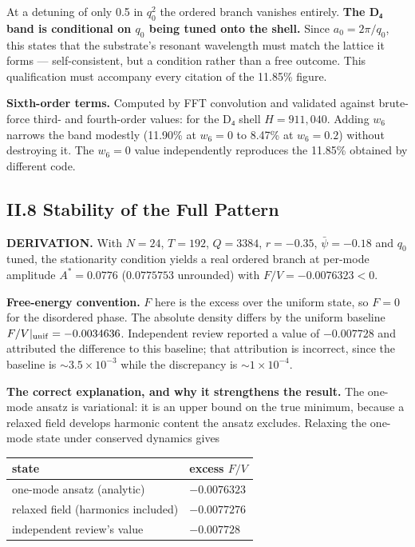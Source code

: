 \documentclass[a4paper,11pt]{article}
\begin{document}
At a detuning of only 0.5 in $q_0^2$ the ordered branch vanishes entirely. \textbf{The D₄ band is conditional on $q_0$ being tuned onto the shell.} Since $a_0=2\pi/q_0$, this states that the substrate's resonant wavelength must match the lattice it forms — self-consistent, but a condition rather than a free outcome. This qualification must accompany every citation of the 11.85\% figure.

\textbf{Sixth-order terms.} Computed by FFT convolution and validated against brute-force third- and fourth-order values: for the D₄ shell $H=911{,}040$. Adding $w_6$ narrows the band modestly (11.90\% at $w_6=0$ to 8.47\% at $w_6=0.2$) without destroying it. The $w_6=0$ value independently reproduces the 11.85\% obtained by different code.

\subsection*{II.8 Stability of the Full Pattern}

\textbf{DERIVATION.} With $N=24$, $T=192$, $Q=3384$, $r=-0.35$, $\bar\psi=-0.18$ and $q_0$ tuned, the stationarity condition yields a real ordered branch at per-mode amplitude $A^{*}=0.0776$ ($0.0775753$ unrounded) with $F/V=-0.0076323<0$.

\textbf{Free-energy convention.} $F$ here is the excess over the uniform state, so $F=0$ for the disordered phase. The absolute density differs by the uniform baseline $F/V|_{\rm unif}=-0.0034636$. Independent review reported a value of $-0.007728$ and attributed the difference to this baseline; that attribution is incorrect, since the baseline is $\sim3.5\times10^{-3}$ while the discrepancy is $\sim1\times10^{-4}$.

\textbf{The correct explanation, and why it strengthens the result.} The one-mode ansatz is variational: it is an upper bound on the true minimum, because a relaxed field develops harmonic content the ansatz excludes. Relaxing the one-mode state under conserved dynamics gives

\begin{center}
\begin{tabular}{ll}
\hline
state & excess $F/V$ \\
\hline
one-mode ansatz (analytic) & $-0.0076323$ \\
relaxed field (harmonics included) & \textbf{$-0.0077276$} \\
independent review's value & $-0.007728$ \\
\hline
\end{tabular}
\end{center}
\end{document}
